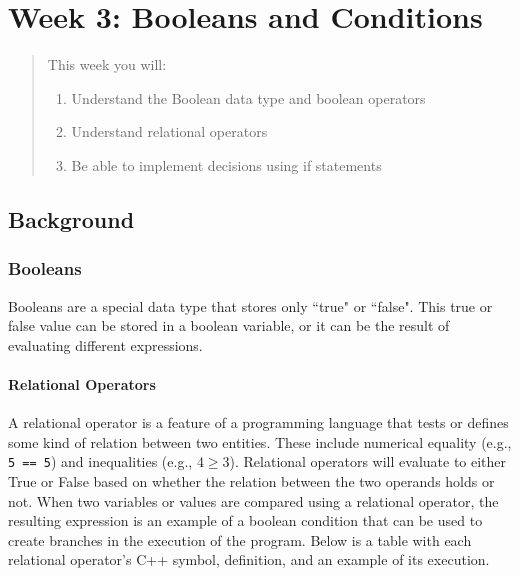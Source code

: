\chapter*{Week 3: Booleans and Conditions}
\setcounter{chapter}{3}
\setcounter{section}{0}

\begin{abstract}
This week you will:
\begin{enumerate}
    \item Understand the Boolean data type and boolean operators
    \item Understand relational operators
    \item Be able to implement decisions using if statements

\end{enumerate}
    
\end{abstract}

\section{Background}

\subsection{Booleans}
Booleans are a special data type that stores only ``true" or ``false". This true or false value can be stored in a boolean variable, or it can be the result of evaluating different expressions.

\subsubsection{Relational Operators}
A relational operator is a feature of a programming language that tests or defines some kind of relation between two entities. These include numerical equality (e.g., \texttt{5 == 5}) and inequalities (e.g., $4 \geq 3$). Relational operators will evaluate to either True or False based on whether the relation between the two operands holds or not. When two variables or values are compared using a relational operator, the resulting expression is an example of a boolean condition that can be used to create branches in the execution of the program. Below is a table with each relational operator’s C++ symbol, definition, and an example of its execution.

